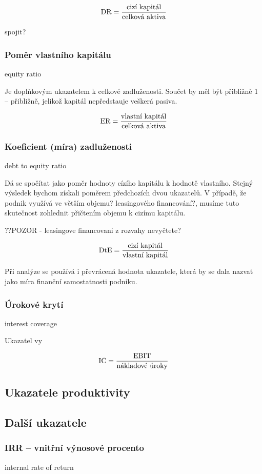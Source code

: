 $$\text{DR} = \dfrac{\text{cizí kapitál}}{\text{celková aktiva}}$$

spojit?
\subsubsection{Poměr vlastního kapitálu}
equity ratio

Je doplňkovým ukazatelem k celkové zadluženosti. Součet by měl být přibližně 1 -- přibližně, jelikož kapitál nepředstauje veškerá pasiva.

$$\text{ER} = \dfrac{\text{vlastní kapitál}}{\text{celková aktiva}}$$

\subsubsection{Koeficient (míra) zadluženosti}
debt to equity ratio

Dá se spočítat jako poměr hodnoty cízího kapitálu k hodnotě vlastního. Stejný výsledek bychom získali poměrem předchozích dvou ukazatelů. V případě, že podnik využívá ve větším objemu? leasingového financování?, musíme tuto skutečnost zohlednit přičtením objemu k cizímu kapitálu. 

??POZOR - leasingove financovani z rozvahy nevyčtete?

$$\text{DtE} = \dfrac{\text{cizí kapitál}}{\text{vlastní kapitál}}$$

Při analýze se používá i převrácená hodnota ukazatele, která by se dala nazvat jako míra finanční samostatnosti podniku.

\subsubsection{Úrokové krytí}
interest coverage

Ukazatel vy

$$\text{IC} = \dfrac{\text{EBIT}}{\text{nákladové úroky}}$$







\subsection{Ukazatele produktivity}

\subsection{Další ukazatele}

\subsubsection{IRR -- vnitřní výnosové procento}
internal rate of return

